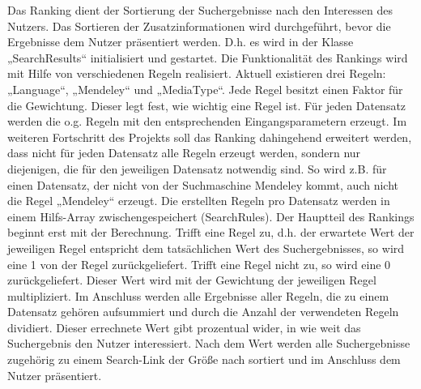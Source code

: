 Das Ranking dient der Sortierung der Suchergebnisse nach den Interessen des Nutzers. Das Sortieren der Zusatzinformationen wird durchgeführt, bevor die Ergebnisse dem Nutzer präsentiert werden. D.h. es wird in der Klasse „SearchResults“ initialisiert und gestartet. 
Die Funktionalität des Rankings wird mit Hilfe von verschiedenen Regeln realisiert. Aktuell existieren drei Regeln: „Language“, „Mendeley“ und „MediaType“. Jede Regel besitzt einen Faktor für die Gewichtung. Dieser legt fest, wie wichtig eine Regel ist. Für jeden Datensatz werden die o.g. Regeln mit den entsprechenden Eingangsparametern erzeugt. Im weiteren Fortschritt des Projekts soll das Ranking dahingehend erweitert werden, dass nicht für jeden Datensatz alle Regeln erzeugt werden, sondern nur diejenigen, die für den jeweiligen Datensatz notwendig sind. So wird z.B. für einen Datensatz, der nicht von der Suchmaschine Mendeley kommt, auch nicht die Regel „Mendeley“ erzeugt. 
Die erstellten Regeln pro Datensatz werden in einem Hilfs-Array zwischengespeichert (SearchRules). Der Hauptteil des Rankings beginnt erst mit der Berechnung. Trifft eine Regel zu, d.h. der erwartete Wert der jeweiligen Regel entspricht dem tatsächlichen Wert des Suchergebnisses, so wird eine 1 von der Regel zurückgeliefert. Trifft eine Regel nicht zu, so wird eine 0 zurückgeliefert. Dieser Wert wird mit der Gewichtung der jeweiligen Regel multipliziert. Im Anschluss werden alle Ergebnisse aller Regeln, die zu einem Datensatz gehören aufsummiert und durch die Anzahl der verwendeten Regeln dividiert. Dieser errechnete Wert gibt prozentual wider, in wie weit das Suchergebnis den Nutzer interessiert. Nach dem Wert werden alle Suchergebnisse zugehörig zu einem Search-Link der Größe nach sortiert und im Anschluss dem Nutzer präsentiert. 


